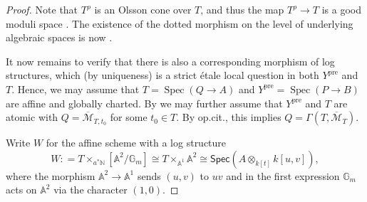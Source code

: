 \documentclass[11pt]{amsart}
\newcommand{\PKHcomment}[1]{{\color{red}PKH: #1}}
\theoremstyle{definition}
\theoremstyle{definition}
\newcommand{\cM}{\mathcal{M}}
\newcommand{\cal}{\mathcal}
\def\cM{{\cal M}}
\begin{document}
\begin{proof}
    Note that $T^\rho$ is an Olsson cone over $T$, and thus the map $T^\rho \rightarrow T$ is a good moduli space \cite[Proposition 5.6]{VBOlssonFan}.
    The existence of the dotted morphism on the level of underlying algebraic spaces is now \cite[Theorem 6.6]{Alper2013GoodModuli}. 

    It now remains to verify that there is also a corresponding morphism of log structures, which (by uniqueness) is a strict \'etale local question in both $Y^\text{pre}$ and $T$. Hence, we may assume that $T = \operatorname{Spec}(Q\rightarrow A)$ and $Y^\text{pre} = \operatorname{Spec}(P \rightarrow B)$ are affine and globally charted. By \cite[Lemma 2.2.5]{AWbirational} we may further assume that $Y^\text{pre}$ and $T$ are atomic with $Q = \overline{\cM}_{T,t_0}$ for some $t_0\in T$. By op.cit., this implies $Q = \Gamma(T,\overline{\cM}_T)$.

    Write $W$ for the affine scheme with a log structure $$W\colon = T\times_{a^\ast\mathbb{N}}[\mathbb{A}^2/\mathbb{G}_m] \cong T\times_{\mathbb{A}^1}\mathbb{A}^2\cong \mathsf{Spec}(A\otimes_{k[t]}k[u,v]),$$ where the morphism $\mathbb{A}^2\rightarrow \mathbb{A}^1$ sends $(u,v)$ to $uv$ and in the first expression $\mathbb{G}_m$ acts on $\mathbb{A}^2$ via the character $(1,0)$. 
    

\end{proof}
\end{document}
